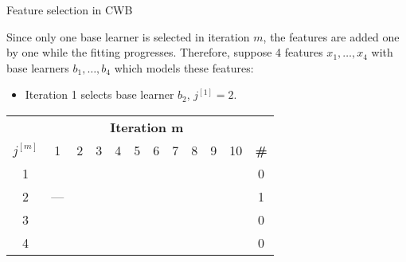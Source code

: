 \newcommand{\phl}{\phantom{---}}

\begin{vbframe}{Feature selection in CWB}

Since only one base learner is selected in iteration $m$, the features are added one by one while the fitting progresses. Therefore, suppose 4 features $x_1, \dots, x_4$ with base learners $b_1, \dots, b_4$ which models these features:
\begin{itemize}
    \item 
        Iteration 1 selects base learner $b_{2}$, $j^{[1]} = 2$.
\end{itemize}
\begin{table}
  \centering
  \scriptsize
    \begin{tabular}{c|cccccccccc|c}
    \multicolumn{1}{c|}{} & \multicolumn{10}{c}{\bfseries Iteration m} \\ 
    $j^{[m]}$ & 1 & 2 & 3 & 4 & 5 & 6 & 7 & 8 & 9 & 10  & {\bfseries \#} \\ \hline\hline
    1 &     & \phl &     &     &     &     &     &     & \phl & \phl & 0\\
    2 & --- &     & \phl &     &     & \phl & \phl & \phl &     &     & 1\\
    3 &     &     &     & \phl & \phl &     &     &     &     &     & 0\\
    4 &     &     &     &     &     &     &     &     &     &     & 0 
    \end{tabular}
\end{table}

\end{vbframe}

